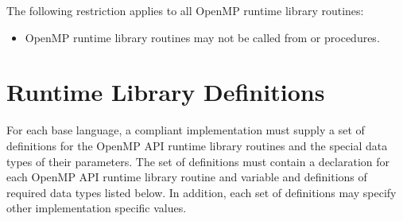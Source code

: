 \begin{samepage}

\begin{fortranspecific}

\restrictions

The following restriction applies to all OpenMP runtime library routines:

\begin{itemize}
\item OpenMP runtime library routines may not be called from  or 
procedures.
\end{itemize}
\end{fortranspecific}
\end{samepage}











\section{Runtime Library Definitions}
\label{sec:runtime library definitions}
For each base language, a compliant implementation must supply a set of definitions for
the OpenMP API runtime library routines and the special data types of their parameters.
The set of definitions must contain a declaration for each OpenMP API runtime library
routine and variable and definitions of required data types listed below. In addition,
each set of definitions may specify other implementation specific values.

